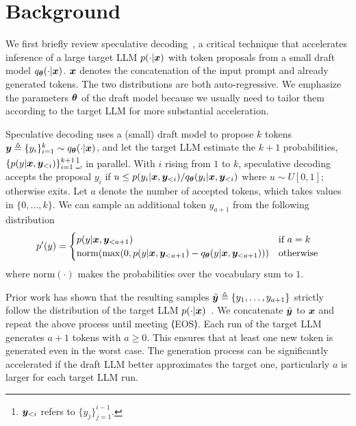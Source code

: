 \section{Background}

We first briefly review speculative decoding~\citep{leviathan2023fast}, a critical technique that accelerates inference of a large target LLM $p(\cdot|{\bm{x}})$ with token proposals from a small draft model $q_{\bm{\theta}}(\cdot|{\bm{x}})$. 
${\bm{x}}$ denotes the concatenation of the input prompt and already generated tokens. %
The two distributions are both auto-regressive. 
We emphasize the parameters ${\bm{\theta}}$ of the draft model because we usually need to tailor them according to the target LLM for more substantial acceleration. 

Speculative decoding uses a (small) draft model to propose $k$ tokens ${{\bm{y}}} \triangleq \{ y_i\}_{i=1}^k \sim q_{\bm{\theta}}(\cdot | {\bm{x}})$, and let the target LLM estimate the $k+1$ probabilities, $\{p({y}|{\bm{x}}, {{\bm{y}}}_{<i})\}_{i=1}^{k+1}$\footnote{${{\bm{y}}}_{<i}$ refers to $\{ y_j\}_{j=1}^{i-1}$.}, in parallel. %
With $i$ rising from $1$ to $k$, speculative decoding accepts the proposal ${y}_i$ if $u \leq  p(y_i|{\bm{x}}, {{\bm{y}}}_{<i}) / q_{\bm{\theta}}({y}_i|{\bm{x}}, {{\bm{y}}}_{<i})$ where $u \sim U[0,1]$; otherwise exits. 
Let $a$ denote the number of accepted tokens, which takes values in $\{0,\dots, k\}$. %
We can sample an additional token ${y}_{a+1}$ from the following distribution 
\begin{equation}
p'(y) =
    \begin{cases}
      p(y|{\bm{x}}, {{\bm{y}}}_{<a+1}) & \text{if $a = k$}\\
      \mathrm{norm}(\max(0, p(y|{\bm{x}}, {{\bm{y}}}_{<a+1}) - q_{\bm{\theta}}(y|{\bm{x}}, {{\bm{y}}}_{<a+1}))) & \text{otherwise}
    \end{cases}       
\end{equation}
where $\mathrm{norm}(\cdot)$ makes the probabilities over the vocabulary sum to $1$. 

Prior work has shown that the resulting samples $\tilde{{\bm{y}}} \triangleq \{{y}_1, \dots, y_{a+1}\}$ strictly follow the distribution of the target LLM $p(\cdot|{\bm{x}})$~\citep{leviathan2023fast}. 
We concatenate $\tilde{{\bm{y}}}$ to ${\bm{x}}$ and repeat the above process until meeting ⟨EOS⟩. 
Each run of the target LLM generates $a+1$ tokens with $a\geq0$. This ensures that at least one new token is generated even in the worst case. 
The generation process can be significantly accelerated if the draft LLM better approximates the target one, particularly $a$ is larger for each target LLM run.


